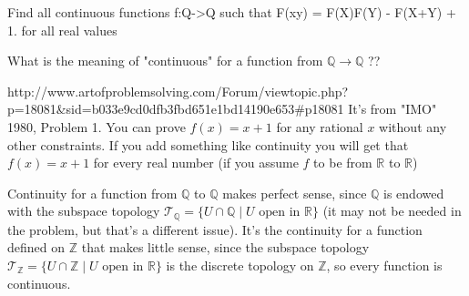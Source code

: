 \begin{solution}
	\begin{tcolorbox}Find all continuous functions f:Q->Q such that F(xy) = F(X)F(Y) - F(X+Y) + 1. for all real values\end{tcolorbox}
What is the meaning of "continuous" for a function from $\mathbb Q\to\mathbb Q$ ??
\end{solution}



\begin{solution}
	http://www.artofproblemsolving.com/Forum/viewtopic.php?p=18081&sid=b033e9cd0dfb3fbd651e1bd14190e653#p18081
It's from "IMO" 1980, Problem 1.
You can prove $f(x)=x+1$ for any rational $x$ without any other constraints.
If you add something like continuity you will get that $f(x)=x+1$ for every real number (if you assume $f$ to be from $\mathbb{R}$ to $\mathbb{R}$)
\end{solution}



\begin{solution}
	Continuity for a function from $\mathbb{Q}$ to $\mathbb{Q}$ makes perfect sense, since $\mathbb{Q}$ is endowed with the subspace topology $\mathcal{T}_{\mathbb{Q}} = \{U \cap \mathbb{Q}\mid U \textrm{ open in } \mathbb{R}\}$ (it may not be needed in the problem, but that's a different issue).
It's the continuity for a function defined on $\mathbb{Z}$ that makes little sense, since the subspace topology $\mathcal{T}_{\mathbb{Z}} = \{U \cap \mathbb{Z}\mid U \textrm{ open in } \mathbb{R}\}$ is the discrete topology on $\mathbb{Z}$, so every function is continuous.
\end{solution}




